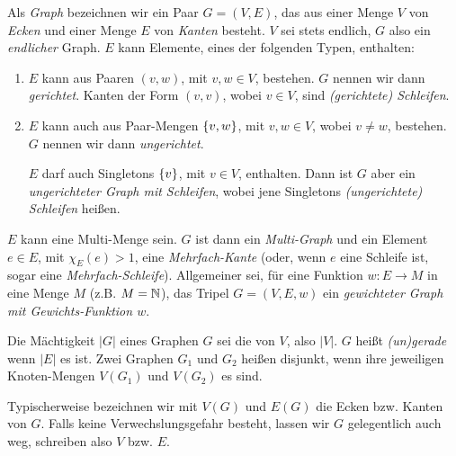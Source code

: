         \begin{definition} \label{def:graph}

            Als \textit{Graph} bezeichnen wir ein Paar $G = (V, E)$, das aus einer Menge $V$ von \textit{Ecken} und einer Menge $E$ von \textit{Kanten} besteht.
            $V$ sei stets endlich, $G$ also ein \textit{endlicher} Graph.
            $E$ kann Elemente, eines der folgenden Typen, enthalten:

            \begin{enumerate}[label = \arabic*.]

                \item $E$ kann aus Paaren $(v, w)$, mit $v, w \in V$, bestehen.
                $G$ nennen wir dann \textit{gerichtet}.
                Kanten der Form $(v, v)$, wobei $v \in V$, sind \textit{(gerichtete) Schleifen}.
                
                \item $E$ kann auch aus Paar-Mengen ${\left \{ v, w \right \}}$, mit $v, w \in V$, wobei $v \neq w$, bestehen.
                $G$ nennen wir dann \textit{ungerichtet}.

                $E$ darf auch Singletons ${\left \{ v \right \}}$, mit $v \in V$, enthalten.
                Dann ist $G$ aber ein \textit{ungerichteter Graph mit Schleifen}, wobei jene Singletons \textit{(ungerichtete) Schleifen} heißen.

            \end{enumerate}
            
            $E$ kann eine Multi-Menge sein.
            $G$ ist dann ein \textit{Multi-Graph} und ein Element $e \in E$, mit $\chi_E(e) > 1$, eine \textit{Mehrfach-Kante} (oder, wenn $e$ eine Schleife ist, sogar eine \textit{Mehrfach-Schleife}).
            Allgemeiner sei, für eine Funktion $w: E \to M$ in eine Menge $M$ (z.B. $M = \mathbb N$), das Tripel $G = (V, E, w)$ ein \textit{gewichteter Graph mit Gewichts-Funktion $w$}.

            Die Mächtigkeit $|G|$ eines Graphen $G$ sei die von $V$, also $|V|$.
            $G$ heißt \textit{(un)gerade} wenn $|E|$ es ist.
            Zwei Graphen $G_1$ und $G_2$ heißen disjunkt, wenn ihre jeweiligen Knoten-Mengen $V(G_1)$ und $V(G_2)$ es sind.

            Typischerweise bezeichnen wir mit $V(G)$ und $E(G)$ die Ecken bzw. Kanten von $G$.
            Falls keine Verwechslungsgefahr besteht, lassen wir $G$ gelegentlich auch weg, schreiben also $V$ bzw. $E$.

        \end{definition}

